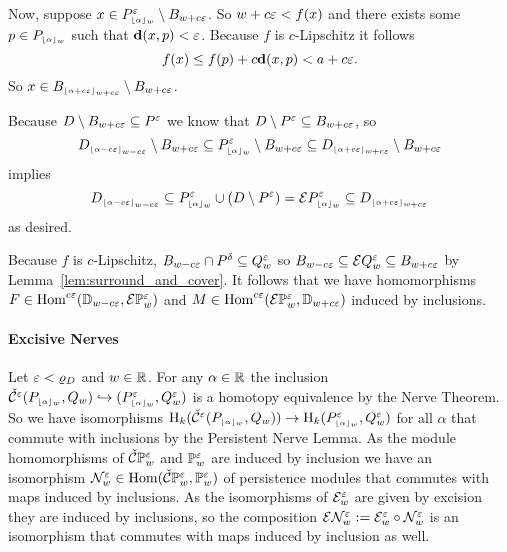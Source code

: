   Now, suppose $x\in P\subi{w}{\alpha}^\e\setminus B_{w+c\e}$.
  So $w+c\e < f(x)$ and there exists some $p\in P\subi{w}{\alpha}$ such that $\dist(x,p) < \e$.
  Because $f$ is $c$-Lipschitz it follows
  \[ f(x) \leq f(p) + c\dist(x,p) < a + c\e.\]
  So $x\in B\subi{w+c\e}{\alpha+c\e}\setminus B_{w+c\e}$.

  Because $D\setminus B_{w+c\e}\subseteq P^\e$ we know that $D\setminus P^\e \subseteq B_{w+c\e}$, so
  \[D\subi{w-c\e}{\alpha-c\e}\setminus B_{w+c\e} \subseteq P\subi{w}{\alpha}^\e\setminus B_{w+c\e}\subseteq D\subi{w+c\e}{\alpha+c\e}\setminus B_{w+c\e}\]
  implies
  \[ D\subi{w-c\e}{\alpha-c\e}\subseteq P\subi{w}{\alpha}^\e\cup (D\setminus P^\e) = \ext{P\subi{w}{\alpha}^\e} \subseteq D\subi{w+c\e}{\alpha+c\e} \]
  as desired.

  Because $f$ is $c$-Lipschitz, $B_{w-c\e}\cap P^\delta\subseteq Q_{w}^\e$ so $B_{w-c\e} \subseteq \E Q_w^\e\subseteq B_{w+c\e}$ by Lemma~\ref{lem:surround_and_cover}.
  It follows that we have homomorphisms $F\in \Hom^{c\e}(\DD{w-c\e}, \E\PP{w}{\e})$ and $M\in\Hom^{c\e}(\E\PP{w}{\e}, \DD{w+c\e})$ induced by inclusions.
\endproofatend

\paragraph{Excisive Nerves}

Let $\e < \varrho_D$ and $w\in\R$.
For any $\alpha\in\R$ the inclusion $\cech^\e(P\subi{w}{\alpha}, Q_w)\hookrightarrow (P\subi{w}{\alpha}^\e, Q_w^\e)$ is a homotopy equivalence by the Nerve Theorem.
So we have isomorphisms $\hom_k(\cech^\e(P\subi{w}{\alpha}, Q_w))\to \hom_k(P\subi{w}{\alpha}^\e, Q_w^\e)$ for all $\alpha$ that commute with inclusions by the Persistent Nerve Lemma.
As the module homomorphisms of $\CPP{w}{\e}$ and $\PP{w}{\e}$ are induced by inclusion we have an isomorphism $\N_w^\e\in\Hom(\CPP{w}{\e}, \PP{w}{\e})$ of persistence modules that commutes with maps induced by inclusions.
As the isomorphisms of $\E_w^\e$ are given by excision they are induced by inclusions, so the composition $\E\N_w^\e := \E_w^\e\circ \N_w^\e$ is an isomorphism that commutes with maps induced by inclusion as well.


